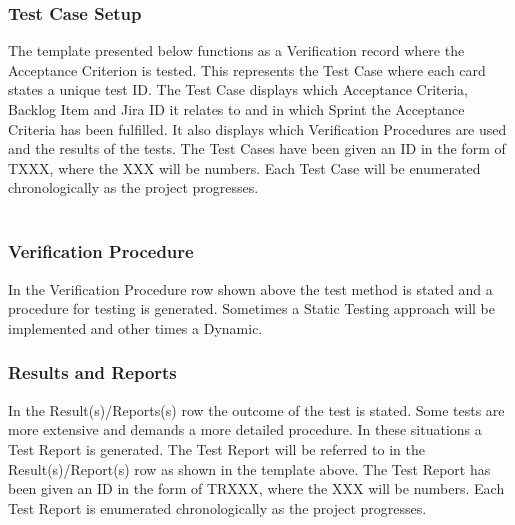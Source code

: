 \newpage

\subsubsection {Test Case Setup}
The template presented below functions as a Verification record where the Acceptance Criterion is tested. This represents the Test Case where each card states a unique test ID. The Test Case displays which Acceptance Criteria, Backlog Item and Jira ID it relates to and in which Sprint the Acceptance Criteria has been fulfilled. It also displays which Verification Procedures are used and the results of the tests. The Test Cases have been given an ID in the form of TXXX, where the XXX will be numbers. Each Test Case will be enumerated chronologically as the project progresses. \\
\\
         {}
         {\shortstack[l]{}}
         {}
         {\shortstack[l]{}}

\subsubsection*{Verification Procedure}
In the Verification Procedure row shown above the test method is stated and a procedure for testing is generated. Sometimes a Static Testing approach will be implemented and other times a Dynamic. 
\\
\subsubsection*{Results and Reports}
In the Result(s)/Reports(s) row the outcome of the test is stated. Some tests are more extensive and demands a more detailed procedure. In these situations a Test Report is generated. The Test Report will be referred to in the Result(s)/Report(s) row as shown in the template above. The Test Report has been given an ID in the form of TRXXX, where the XXX will be numbers. Each Test Report is enumerated chronologically as the project progresses. \\ 
\\

